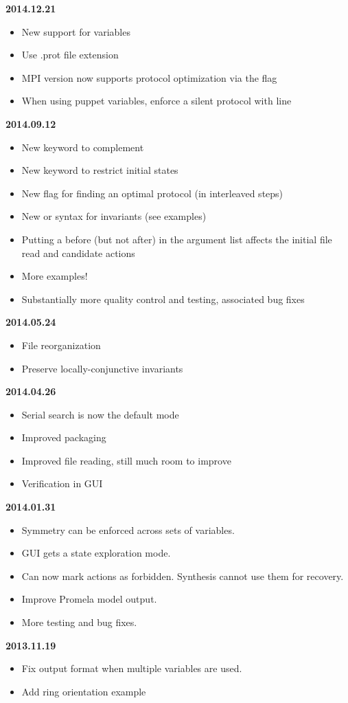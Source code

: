 \textbf{2014.12.21}
\begin{itemize}
\item New support for  variables
\item Use .prot file extension
\item MPI version now supports protocol optimization via the  flag
\item When using puppet variables, enforce a silent protocol with  line
\end{itemize}
\textbf{2014.09.12}
\begin{itemize}
\item New  keyword to complement 
\item New  keyword to restrict initial states
\item New  flag for finding an optimal protocol (in interleaved steps)
\item New  or  syntax for invariants (see examples)
\item Putting a  before (but not after)  in the argument list affects the initial file read and candidate actions
\item More examples!
\item Substantially more quality control and testing, associated bug fixes
\end{itemize}
\textbf{2014.05.24}
\begin{itemize}
\item File reorganization
\item Preserve locally-conjunctive invariants
\end{itemize}
\textbf{2014.04.26}
\begin{itemize}
\item Serial search is now the default mode
\item Improved packaging
\item Improved file reading, still much room to improve
\item Verification in GUI
\end{itemize}
\textbf{2014.01.31}
\begin{itemize}
\item Symmetry can be enforced across sets of variables.
\item GUI gets a state exploration mode.
\item Can now mark actions as forbidden. Synthesis cannot use them for recovery.
\item Improve Promela model output.
\item More testing and bug fixes.
\end{itemize}
\textbf{2013.11.19}
\begin{itemize}
\item Fix output format when multiple variables are used.
\item Add ring orientation example
\end{itemize}

